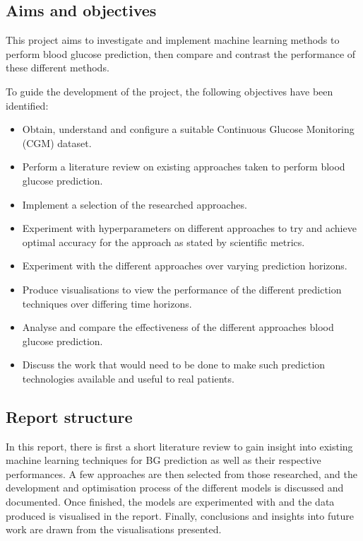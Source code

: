   \subsection{Aims and objectives}
    This project aims to investigate and implement machine learning methods to perform blood glucose prediction, then compare and contrast the performance of these different methods.

    To guide the development of the project, the following objectives have been identified: 
    \begin{itemize}
        \item Obtain, understand and configure a suitable Continuous Glucose Monitoring (CGM) dataset.
        \item Perform a literature review on existing approaches taken to perform blood glucose prediction.
        \item Implement a selection of the researched approaches.
        \item Experiment with hyperparameters on different approaches to try and achieve optimal accuracy for the approach as stated by scientific metrics.
        \item Experiment with the different approaches over varying prediction horizons.
        \item Produce visualisations to view the performance of the different prediction techniques over differing time horizons.
        \item Analyse and compare the effectiveness of the different approaches blood glucose prediction.
        \item Discuss the work that would need to be done to make such prediction technologies available and useful to real patients.
    \end{itemize}
    
  \subsection{Report structure}
    In this report, there is first a short literature review to gain insight into existing machine learning techniques for BG prediction as well as their respective performances. A few approaches are then selected from those researched, and the development and optimisation process of the different models is discussed and documented. Once finished, the models are experimented with and the data produced is visualised in the report. Finally, conclusions and insights into future work are drawn from the visualisations presented.
    
